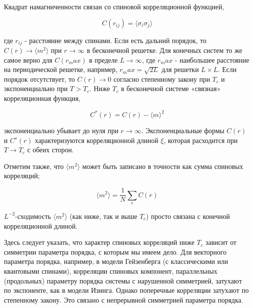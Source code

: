 \documentclass[11pt]{article}
\begin{document}
Квадрат намагниченности связан со спиновой корреляционной функцией,

\begin{equation}
C(r_{ij})=\langle \sigma_i \sigma_j\rangle
\label{eq_49}
\end{equation}

где $r_{ij}$ - расстояние между спинами. Если есть дальний порядок, то $C(r) →  \langle m^2 \rangle$ при $r → ∞$ в бесконечной решетке. Для конечных систем то же самое верно для $C(r_max)$ в пределе $L → ∞$, где $r_max$ - наибольшее расстояние на периодической решетке, например, $r_max = \sqrt{2L}$ для
решетки $L × L$. Если порядок отсутствует, то $C(r) → 0$ согласно степенному закону при $T_c$ и экспоненциально при $T> T_c$. Ниже $T_c$ в бесконечной системе «связная» корреляционная функция,

\begin{equation}
C^{*}(r)=C(r)-\langle m \rangle ^2
\label{eq_50}
\end{equation}

экспоненциально убывает до нуля при $r → ∞$. Экспоненциальные формы $C(r)$ и $C^{∗}(r)$ характеризуются корреляционной длиной $\xi$, которая расходится при $T → T_c$ с обеих сторон.

Отметим также, что $\langle m^2 \rangle$ может быть записано в точности как сумма спиновых корреляций;

\begin{equation}
\langle m^2 \rangle = \frac{1}{N}\sum\limits_{r}C(r)
\label{eq_51}
\end{equation}

$L^{−2}$-сходимость $\langle m^2 \rangle$ (как ниже, так и выше $T_c$) просто связана с конечной корреляционной длиной.

Здесь следует указать, что характер спиновых корреляций ниже $T_c$ зависит от симметрии параметра порядка, с которым мы имеем дело. Для векторного параметра порядка, например, в модели Гейзенберга (с классическими или квантовыми спинами), корреляции спиновых компонент, параллельных (продольных) параметру порядка системы с нарушенной симметрией, затухают по экспоненте, как в модели Изинга. Однако поперечные корреляции затухают по степенному закону. Это связано с непрерывной симметрией параметра порядка.
\end{document}
